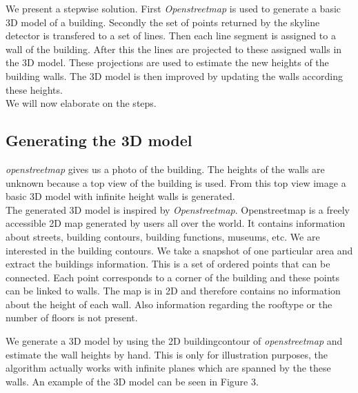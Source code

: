\documentclass[10pt]{article}
\begin{document}
We present a stepwise solution. First \emph{Openstreetmap} is used to generate
a basic 3D model of a building. Secondly the set of points returned by the
skyline detector is transfered to a set of lines. Then each line segment is
assigned to a wall of the building. After this the lines are projected to these
assigned walls in the 3D model. 
These projections are used to estimate the new heights of the building walls.
The 3D model is then improved by updating the walls according these heights. \\
We will now elaborate on the steps.

\subsection{Generating the 3D model}

\emph{openstreetmap} gives us a photo of the
building.  The heights of the walls are unknown because a top view of the
building is used.  
From this top view image a basic 3D model with infinite
height walls is generated.\\





The generated 3D model is inspired by \emph{Openstreetmap}.  Openstreetmap is
a freely accessible 2D map generated by users all over the world. It contains
information about streets, building contours, building functions, museums, etc.
We are interested in the building contours.  We take a snapshot of one
particular area and extract the buildings information.  This is a set of
ordered points that can be connected.  Each point corresponds to a corner of
the building and these points can be linked to walls.  The map is in 2D and
therefore contains no information about the height of each wall.  Also
information regarding the rooftype or the number of floors is not present.

We generate a 3D model by using the 2D buildingcontour of \emph{openstreetmap}
and estimate the wall heights by hand.  This is only for illustration purposes,
the algorithm actually works with infinite planes which are spanned by the
these walls. An example of the 3D model can be seen in Figure 3.


\end{document}
